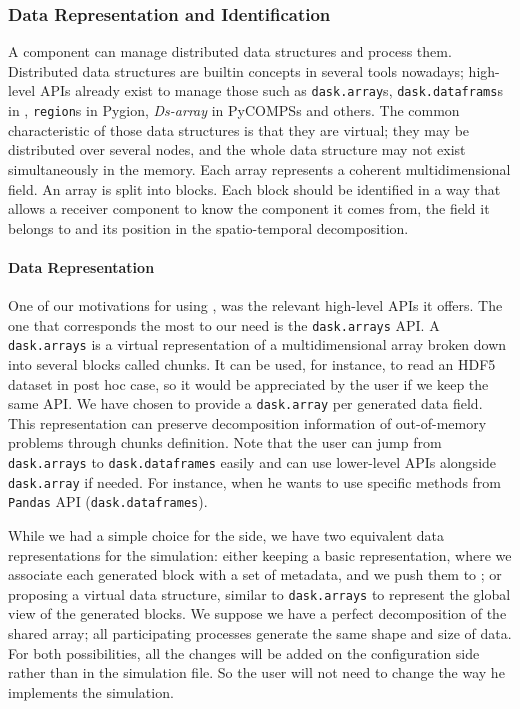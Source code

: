 \subsubsection{Data Representation and Identification}

A \deisa component can manage distributed data structures and process them. Distributed data structures are builtin concepts in several tools nowadays; high-level APIs already exist to manage those such as \texttt{dask.array}s, \texttt{dask.dataframs}s in \dask, \texttt{region}s in Pygion, \textit{Ds-array} in PyCOMPSs and others. 
The common characteristic of those data structures is that they are virtual; they may be distributed over several nodes, and the whole data structure may not exist simultaneously in the memory. 
Each array represents a coherent multidimensional field. An array is split into blocks. Each block should be identified in a way that allows a receiver component to know the component it comes from, the field it belongs to and its position in the spatio-temporal decomposition. 

\paragraph{Data Representation}\label{sec:datamodel:datarepresent}


One of our motivations for using \dask, was the relevant high-level APIs it offers. The one that corresponds the most to our need is the \texttt{dask.arrays} API. 
A \texttt{dask.arrays} is a virtual representation of a multidimensional array broken down into several blocks called chunks. It can be used, for instance, to read an HDF5 dataset in post hoc case, so it would be appreciated by the user if we keep the same API. 
We have chosen to provide a \texttt{dask.array} per generated data field.  
This representation can preserve decomposition information of out-of-memory problems through chunks definition. 
Note that the user can jump from \texttt{dask.arrays} to \texttt{dask.dataframes} easily and can use lower-level APIs alongside \texttt{dask.array} if needed. For instance, when he wants to use specific methods from \texttt{Pandas} API (\texttt{dask.dataframes}).

While we had a simple choice for the \dask side, we have two equivalent data representations for the simulation:
either keeping a basic representation, where we associate each generated block with a set of metadata, and we push them to \dask; 
or proposing a virtual data structure, similar to \texttt{dask.arrays} to represent the global view of the generated blocks.  
We suppose we have a perfect decomposition of the shared array; all participating processes generate the same shape and size of data. 
For both possibilities, all the changes will be added on the configuration side rather than in the simulation file. So the user will not need to change the way he implements the simulation. 

